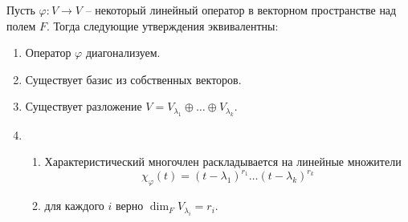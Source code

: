 \begin{claim}
\label{claim::DiagCrit}
Пусть $\varphi\colon V\to V$ -- некоторый линейный оператор в векторном пространстве над полем $F$.
Тогда следующие утверждения эквивалентны:
\begin{enumerate}
\item Оператор $\varphi$ диагонализуем.

\item Существует базис из собственных векторов.

\item Существует разложение $V = V_{\lambda_1}\oplus \ldots \oplus V_{\lambda_k}$.

\item 
\begin{enumerate}
\item Характеристический многочлен раскладывается на линейные множители 
\[
\chi_{\varphi}(t) = (t - \lambda_1)^{r_1} \ldots (t - \lambda_k)^{r_k}
\]

\item для каждого $i$ верно $\dim_F V_{\lambda_i} = r_i$.
\end{enumerate}
\end{enumerate}
\end{claim}
